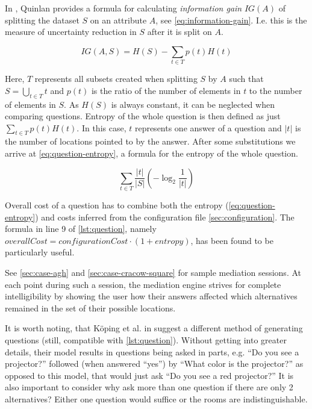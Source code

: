 In \cite{quinlan1986induction}, Quinlan provides a formula for calculating \emph{information gain} $IG(A)$ of splitting the dataset $S$ on an attribute $A$, see \cref{eq:information-gain}. I.e. this is the measure of uncertainty reduction in $S$ after it is split on $A$.

\begin{equation}
  \label{eq:information-gain}
  IG(A,S) = H(S) - \sum_{t \in T} p(t)H(t)
\end{equation}

Here, $T$ represents all subsets created when splitting $S$ by $A$ such that $S = \bigcup_{t \in T} t$ and $p(t)$ is the ratio of the number of elements in $t$ to the number of elements in $S$. As $H(S)$ is always constant, it can be neglected when comparing questions. Entropy of the whole question is then defined as just $\sum_{t \in T} p(t)H(t)$. In this case, $t$ represents one answer of a question and $\vert t \vert$ is the number of locations pointed to by the answer. After some substitutions we arrive at \cref{eq:question-entropy}, a formula for the entropy of the whole question.

\begin{equation}
  \label{eq:question-entropy}
  \sum_{t \in T} \frac{\vert t \vert}{\vert S \vert}\left(-\log_2 \frac{1}{\vert t \vert}\right)
\end{equation}

Overall cost of a question has to combine both the entropy (\cref{eq:question-entropy}) and costs inferred from the configuration file \cref{sec:configuration}. The formula in line 9 of \cref{lst:question}, namely $overallCost = configurationCost \cdot (1 + entropy)$, has been found to be particularly useful.

See \cref{sec:case-agh} and \cref{sec:case-cracow-square} for sample mediation sessions. At each point during such a session, the mediation engine strives for complete intelligibility by showing the user how their answers affected which alternatives remained in the set of their possible locations.

It is worth noting, that Köping et al. in \cite{Koeping2015indoor} suggest a different method of generating questions (still, compatible with \cref{lst:question}). Without getting into greater details, their model results in questions being asked in parts, e.g. ``Do you see a projector?'' followed (when answered ``yes'') by ``What color is the projector?'' as opposed to this model, that would just ask ``Do you see a red projector?'' It is also important to consider why ask more than one question if there are only 2 alternatives? Either one question would suffice or the rooms are indistinguishable.

